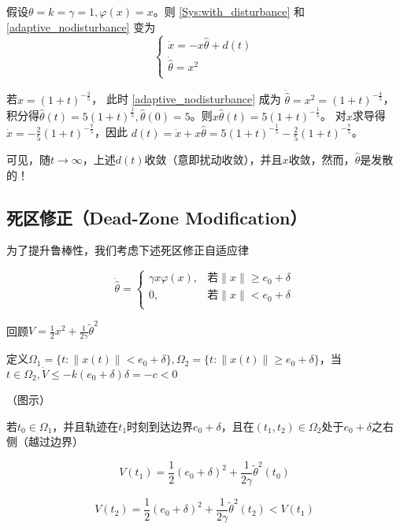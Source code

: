 \begin{example}[扰动衰减但参数估计发散]
    假设\(\theta = k = \gamma = 1,\varphi(x) = x\)。则 \eqref{Sys:with_disturbance} 和 \eqref{adaptive_nodisturbance} 变为
\[\begin{cases}
\dot{x} = - x\hat{\theta} + d(t) \\
\dot{\hat{\theta}} = x^{2} \\
\end{cases}\]

若$x = (1 + t)^{- \frac{2}{5}} $，
此时 \eqref{adaptive_nodisturbance} 成为
$\dot{\hat{\theta}} = x^{2} = (1 + t)^{- \frac{4}{5}} $，
积分得$\hat{\theta}(t) = 5(1 + t)^{\frac{1}{5}},\hat{\theta}(0) = 5$。则\(x\hat{\theta}(t) = 5(1 + t)^{- \frac{1}{5}}\)。
对$x$求导得$\dot{x} = - \frac{2}{5}(1 + t)^{- \frac{7}{5}}$，因此
$d(t) = \dot{x} + x\hat{\theta} = 5(1 + t)^{- \frac{1}{5}} - \frac{2}{5}(1 + t)^{- \frac{7}{5}}$。

可见，随$t\to\infty$，上述\(d(t)\)收敛（意即扰动收敛），并且\(x\)收敛，然而，\(\hat{\theta}\)是发散的！
\end{example}

\subsection{死区修正（Dead-Zone Modification）}

为了提升鲁棒性，我们考虑下述死区修正自适应律

\[\dot{\hat{\theta}} = \left\{\begin{matrix}
\gamma x\varphi(x), & \text{若} \| x \| \geq e_{0} + \delta \\
0, & \text{若} \| x \| < e_{0} + \delta \\
\end{matrix}\right.\]

回顾\(V = \frac{1}{2}x^{2} + \frac{1}{2\gamma}{\tilde{\theta}}^{2}\)

定义\(\Omega_{1} = \{ t: \| x(t) \| < e_{0} + \delta\},\Omega_{2} = \{ t: \| x(t) \| \geq e_{0} + \delta\}\)，当\(t \in \Omega_{2},\dot{V} \leq - k(e_{0} + \delta)\delta = - c < 0\)

（图示）

若\(t_{0} \in \Omega_{1}\)，并且轨迹在\(t_{1}\)时刻到达边界\(e_{0} + \delta\)，且在\((t_{1},t_{2}) \in \Omega_{2}\)处于\(e_{0} + \delta\)之右侧（越过边界）

\[V(t_{1}) = \frac{1}{2}(e_{0} + \delta)^{2} + \frac{1}{2\gamma}{\tilde{\theta}}^{2}(t_{0})\]

\[V(t_{2}) = \frac{1}{2}(e_{0} + \delta)^{2} + \frac{1}{2\gamma}{\tilde{\theta}}^{2}(t_{2}) < V(t_{1})\]

